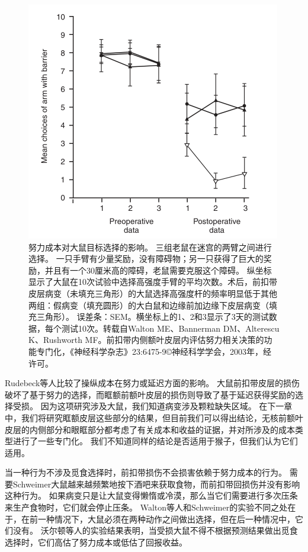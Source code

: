 \begin{figure}[!htb]
	\centering
	\includegraphics{image_pfc/Fig_3_7}
	\caption{努力成本对大鼠目标选择的影响。
		三组老鼠在迷宫的两臂之间进行选择。
		一只手臂有少量奖励，没有障碍物；另一只获得了巨大的奖励，并且有一个30厘米高的障碍，老鼠需要克服这个障碍。
		纵坐标显示了大鼠在10次试验中选择高强度手臂的平均次数。术后，前扣带皮层病变（未填充三角形）的大鼠选择高强度杆的频率明显低于其他两组：假病变（填充圆形）的大白鼠和边缘前加边缘下皮层病变（填充三角形）。
		误差条：SEM。横坐标上的1、2和3显示了3天的测试数据，每个测试10次。转载自Walton ME、Bannerman DM、Alterescu K、Rushworth MF。前扣带内侧额叶皮层内评估努力相关决策的功能专门化，《神经科学杂志》23:6475-9©神经科学学会，2003年，经许可。}
	\label{fig:3_7}
\end{figure}


Rudebeck等人\cite{rudebeck2006separate}比较了操纵成本在努力或延迟方面的影响。
大鼠前扣带皮层的损伤破坏了基于努力的选择，而眶额前额叶皮层的损伤则导致了基于延迟获得奖励的选择受损。
因为这项研究涉及大鼠，我们知道病变涉及颗粒缺失区域。
在下一章中，我们将研究眶额皮层这些部分的结果，但目前我们可以得出结论，无核前额叶皮层的内侧部分和眼眶部分都考虑了有关成本和收益的证据，并对所涉及的成本类型进行了一些专门化。
我们不知道同样的结论是否适用于猴子，但我们认为它们适用。\par


当一种行为不涉及觅食选择时，前扣带损伤不会损害依赖于努力成本的行为。
需要Schweimer\cite{schweimer2005involvement}大鼠越来越频繁地按下酒吧来获取食物，而前扣带回损伤并没有影响这种行为。
如果病变只是让大鼠变得懒惰或冷漠，那么当它们需要进行多次压条来生产食物时，它们就会停止压条。
Walton等人\cite{walton2002role}和Schweimer\cite{schweimer2005involvement}的实验不同之处在于，在前一种情况下，大鼠必须在两种动作之间做出选择，但在后一种情况中，它们没有。
沃尔顿等人的实验结果表明，当受损大鼠不得不根据预测结果做出觅食选择时，它们高估了努力成本或低估了回报收益。\par



